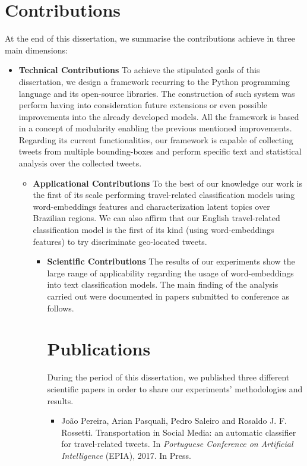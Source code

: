 \section{Contributions}
\label{seCc:contributions}
At the end of this dissertation, we summarise the contributions achieve in three main dimensions:

\begin{itemize}
	\item \textbf{Technical Contributions}
	To achieve the stipulated goals of this dissertation, we design a framework recurring to the Python programming language and its open-source libraries. The construction of such system was perform having into consideration future extensions or even possible improvements into the already developed models. All the framework is based in a concept of modularity enabling the previous mentioned improvements. Regarding its current functionalities, our framework is capable of collecting tweets from multiple bounding-boxes and perform specific text and statistical analysis over the collected tweets.

\begin{itemize}
	\item \textbf{Applicational Contributions}
	To the best of our knowledge our work is the first of its scale performing travel-related classification models using word-embeddings features and characterization latent topics over Brazilian regions. We can also affirm that our English travel-related classification model is the first of its kind (using word-embeddings features) to try discriminate geo-located tweets.  

\begin{itemize}
	\item \textbf{Scientific Contributions}
	The results of our experiments show the large range of applicability regarding the usage of word-embeddings into text classification models. The main finding of the analysis carried out were documented in papers submitted to conference as follows. 

\section{Publications}
\label{sec:publications}
During the period of this dissertation, we published three different scientific papers in order to share our experiments' methodologies and results.

\begin{itemize}
	\item
	João Pereira, Arian Pasquali, Pedro Saleiro and Rosaldo J. F. Rossetti. {\color{blue}Transportation in Social Media: an automatic classifier for travel-related tweets}. In \emph{Portuguese Conference on Artificial Intelligence} (EPIA), 2017. In Press.
	

\end{itemize}
\end{itemize}
\end{itemize}
\end{itemize}
